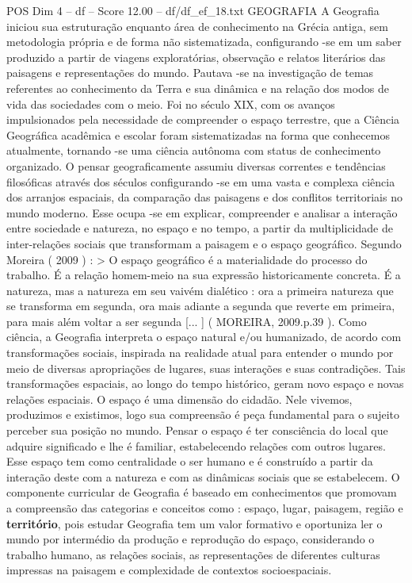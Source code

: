 \begin{textsample}{POS Dim 4 – df – Score 12.00 – df/df\_ef\_18.txt}  \label{ex:f4_pos_222}
GEOGRAFIA A Geografia iniciou sua estruturação enquanto área de conhecimento na Grécia antiga, sem metodologia própria e de forma não sistematizada, configurando -se em um saber produzido a partir de viagens exploratórias, observação e relatos literários das paisagens e representações do mundo.
Pautava -se na investigação de temas referentes ao conhecimento da Terra e sua dinâmica e na relação dos modos de vida das sociedades com o meio.
Foi no século XIX, com os avanços impulsionados pela necessidade de compreender o espaço terrestre, que a Ciência Geográfica acadêmica e escolar foram sistematizadas na forma que conhecemos atualmente, tornando -se uma ciência autônoma com status de conhecimento organizado.
O pensar geograficamente assumiu diversas correntes e tendências filosóficas através dos séculos configurando -se em uma vasta e complexa ciência dos arranjos espaciais, da comparação das paisagens e dos conflitos territoriais no mundo moderno.
Esse ocupa -se em explicar, compreender e analisar a interação entre sociedade e natureza, no espaço e no tempo, a partir da multiplicidade de inter-relações sociais que transformam a paisagem e o espaço geográfico.
Segundo Moreira ( 2009 ) : > O espaço geográfico é a materialidade do processo do trabalho.
É a relação homem-meio na sua expressão historicamente concreta.
É a natureza, mas a natureza em seu vaivém dialético : ora a primeira natureza que se transforma em segunda, ora mais adiante a segunda que reverte em primeira, para mais além voltar a ser segunda [... ] ( MOREIRA, 2009.p.39 ).
Como ciência, a Geografia interpreta o espaço natural e/ou humanizado, de acordo com transformações sociais, inspirada na realidade atual para entender o mundo por meio de diversas apropriações de lugares, suas interações e suas contradições.
Tais transformações espaciais, ao longo do tempo histórico, geram novo espaço e novas relações espaciais.
O espaço é uma dimensão do cidadão.
Nele vivemos, produzimos e existimos, logo sua compreensão é peça fundamental para o sujeito perceber sua posição no mundo.
Pensar o espaço é ter consciência do local que adquire significado e lhe é familiar, estabelecendo relações com outros lugares.
Esse espaço tem como centralidade o ser humano e é construído a partir da interação deste com a natureza e com as dinâmicas sociais que se estabelecem.
O componente curricular de Geografia é baseado em conhecimentos que promovam a compreensão das categorias e conceitos como : espaço, lugar, paisagem, região e \textbf{território}, pois estudar Geografia tem um valor formativo e oportuniza ler o mundo por intermédio da produção e reprodução do espaço, considerando o trabalho humano, as relações sociais, as representações de diferentes culturas impressas na paisagem e complexidade de contextos socioespaciais.

\end{textsample}
